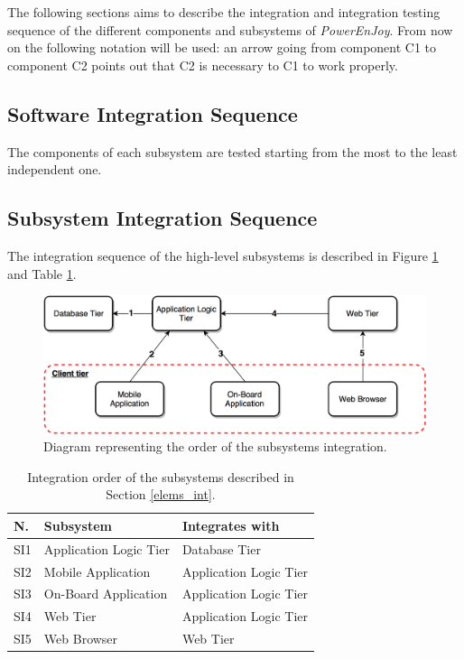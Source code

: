 The following sections aims to describe the integration and integration testing sequence of the different components and subsystems of \emph{PowerEnJoy}. From now on the following notation will be used: an arrow going from component C1 to component C2 points out that C2 is necessary to C1 to work properly.

\subsection{Software Integration Sequence}
The components of each subsystem are tested starting from the most to the least independent one.


\subsection{Subsystem Integration Sequence}
The integration sequence of the high-level subsystems is described in Figure \ref{h_level_subsys} and Table \ref{subsys_int}.

\begin{figure}[H]
\begin{center}
		\includegraphics[width=\textwidth]{./integration_strategy/diagrams/h_level_subsys.png}
		\caption{Diagram representing the order of the subsystems integration.}
		\label{h_level_subsys}
\end{center}
\end{figure}

\begin{table}[H]
\begin{center}
\begin{tabular}{p{} | p{} | p{}}
\hline
\textbf{N.} & \textbf{Subsystem} & \textbf{Integrates with} \\
\hline
SI1 & Application Logic Tier & Database Tier \\
\hline
SI2 & Mobile Application & Application Logic Tier \\
\hline
SI3 & On-Board Application & Application Logic Tier \\
\hline
SI4 & Web Tier & Application Logic Tier \\
\hline
SI5 & Web Browser & Web Tier \\
\hline
\end{tabular}
\end{center}
\caption{Integration order of the subsystems described in Section \ref{elems_int}.}
\label{subsys_int}
\end{table}

